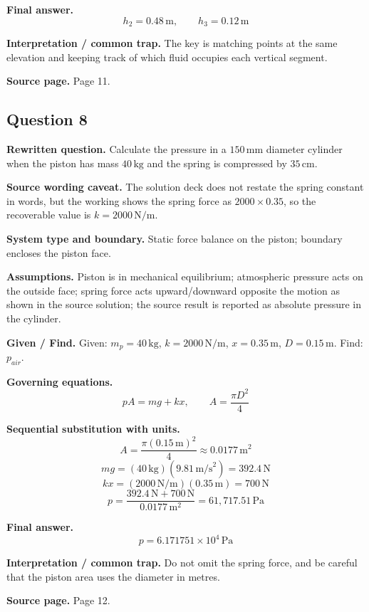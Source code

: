 \textbf{Final answer.}
\[
\boxed{h_2=0.48\,\text{m},\qquad h_3=0.12\,\text{m}}
\]

\textbf{Interpretation / common trap.} The key is matching points at the same elevation and keeping track of which fluid occupies each vertical segment.

\textbf{Source page.} Page 11.

\subsection*{Question 8}
\textbf{Rewritten question.} Calculate the pressure in a $150\,\text{mm}$ diameter cylinder when the piston has mass $40\,\text{kg}$ and the spring is compressed by $35\,\text{cm}$.

\textbf{Source wording caveat.} The solution deck does not restate the spring constant in words, but the working shows the spring force as $2000\times0.35$, so the recoverable value is $k=2000\,\text{N/m}$.

\textbf{System type and boundary.} Static force balance on the piston; boundary encloses the piston face.

\textbf{Assumptions.} Piston is in mechanical equilibrium; atmospheric pressure acts on the outside face; spring force acts upward/downward opposite the motion as shown in the source solution; the source result is reported as absolute pressure in the cylinder.

\textbf{Given / Find.}
Given: $m_p=40\,\text{kg}$, $k=2000\,\text{N/m}$, $x=0.35\,\text{m}$, $D=0.15\,\text{m}$.
Find: $p_{air}$.

\textbf{Governing equations.}
\[
pA=mg+kx,\qquad A=\frac{\pi D^2}{4}
\]

\textbf{Sequential substitution with units.}
\[
A=\frac{\pi(0.15\,\text{m})^2}{4}\approx0.0177\,\text{m}^2
\]
\[
mg=(40\,\text{kg})(9.81\,\text{m/s}^2)=392.4\,\text{N}
\]
\[
kx=(2000\,\text{N/m})(0.35\,\text{m})=700\,\text{N}
\]
\[
p=\frac{392.4\,\text{N}+700\,\text{N}}{0.0177\,\text{m}^2}=61{,}717.51\,\text{Pa}
\]

\textbf{Final answer.}
\[
\boxed{p=6.171751\times10^4\,\text{Pa}}
\]

\textbf{Interpretation / common trap.} Do not omit the spring force, and be careful that the piston area uses the diameter in metres.

\textbf{Source page.} Page 12.

